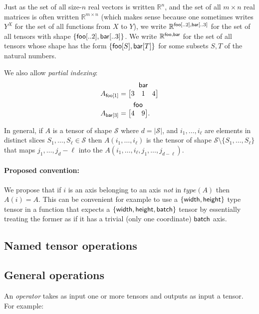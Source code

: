 \documentclass{article}
\makeatletter
\newcommand{\tuple}[1]{\{#1\}}
\newcommand{\nmatrix}[3]{\name{#1}\begin{array}[b]{@{}c@{}}\name{#2}\\\begin{bmatrix}#3\end{bmatrix}\end{array}}
\makeatother
\begin{document}
Just as the set of all size-$n$ real vectors is written $\mathbb{R}^n$, and the set of all $m\times n$ real matrices is often written $\mathbb{R}^{m \times n}$ (which makes sense because one sometimes writes $Y^X$ for the set of all functions from $X$ to $Y$), we write $\mathbb{R}^{\mathsf{foo}[..2], \mathsf{bar}[..3]}$ for the set of all tensors with shape $\tuple{\nset{foo}{..2}, \nset{bar}{..3}}$.
We write $\mathbb{R}^{\mathsf{foo},\mathsf{bar}}$ for the set of all tensors whose shape has the form $\{ \mathsf{foo}[S], \mathsf{bar}[T] \}$ for some subsets $S,T$ of the natural numbers.


We also allow \emph{partial indexing}:
\begin{align*}
A_{\nidx{foo}{1}} &= \nmatrix{}{bar}{
  3 & 1 & 4
}
\\
A_{\nidx{bar}{3}} &= \nmatrix{}{foo}{
  4 & 9
}.
\end{align*}

In general, if $A$ is a tensor of shape $\mathcal{S}$ where $d=|\mathcal{S}|$, and $i_1,\ldots,i_\ell$ are elements in distinct slices $S_1,\ldots,S_\ell \in \mathcal{S}$ then $A(i_1,\ldots,i_\ell)$ is the tensor of shape $\mathcal{S} \setminus \{ S_1,\ldots, S_\ell \}$ that maps $j_1,\ldots,j_d-{\ell}$ into the $A(i_1,\ldots,i_\ell,j_1,\ldots,j_{d-\ell})$.



\paragraph{Proposed convention:} We propose that if $i$ is an axis belonging to an axis  \emph{not} in  $type(A)$ then $A(i)=A$.  This can be convenient for example to use a $\{ \mathsf{width} ,\mathsf{height} \}$ type tensor in a function that expects a $\{ \mathsf{width} , \mathsf{height} , \mathsf{batch} \}$ tensor by essentially treating the former as if it has a trivial (only one coordinate) $\mathsf{batch}$ axis.


\subsection{Named tensor operations}
\label{sec:operations}

\subsection{General operations}

An \emph{operator}  takes as input one or more tensors and outputs as input a tensor. For example:
\end{document}

